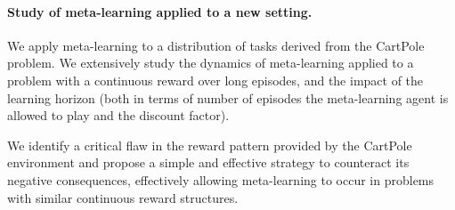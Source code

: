 \paragraph{Study of meta-learning applied to a new setting.} We apply meta-learning
to a distribution of tasks derived from the CartPole problem. We extensively
study the dynamics of meta-learning applied to a problem with a continuous
reward over long episodes, and the impact of the learning horizon (both
in terms of number of episodes the meta-learning agent is allowed to play
and the discount factor). 

We identify a critical flaw in the reward pattern provided by the CartPole
environment and propose a simple and effective strategy to counteract its
negative consequences, effectively allowing meta-learning to occur in
problems with similar continuous reward structures.
